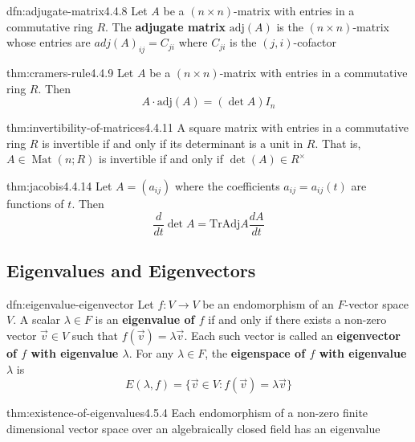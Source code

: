 \documentclass[landscape, 8pt]{extarticle}
\DeclareMathOperator{\Mat}{Mat}
\begin{document}
\begin{multicols}{3}
\begin{dfn}{dfn:adjugate-matrix}{4.4.8}
    Let $A$ be a $(n \times n)$-matrix with entries in a commutative ring $R$. The \textbf{adjugate matrix} $\text{adj}(A)$ is the $(n \times n)$-matrix whose entries are $adj(A)_{ij} = C_{ji}$ where $C_{ji}$ is the $(j, i)$-cofactor
\end{dfn}

\begin{thm}{thm:cramers-rule}{4.4.9}
    Let $A$ be a $(n \times n)$-matrix with entries in a commutative ring $R$. Then
    \[A \cdot \text{adj}(A) = (\det A)I_{n}\]
\end{thm}

\begin{thm}{thm:invertibility-of-matrices}{4.4.11}
    A square matrix with entries in a commutative ring $R$ is invertible if and only if its determinant is a unit in $R$. That is, $A\in \Mat(n;R)$ is invertible if and only if $\det(A)\in R^{\times}$
\end{thm}

\begin{thm}{thm:jacobis}{4.4.14}
    Let $A = (a_{ij})$ where the coefficients $a_{ij} = a_{ij}(t)$ are functions of $t$. Then
    \[\frac{d}{dt} \det A = \text{Tr}\text{Adj} A \frac{dA}{dt}\]
\end{thm}

\subsection{Eigenvalues and Eigenvectors}

\begin{dfn}{dfn:eigenvalue-eigenvector}{}
    Let $f: V \to V $ be an endomorphism of an $F$-vector space $V$. A scalar $\lambda\in F$ is an \textbf{eigenvalue of $f$} if and only if there exists a non-zero vector $\vec{v}\in V$ such that $f(\vec{v}) = \lambda \vec{v}$. Each such vector is called an \textbf{eigenvector of $f$ with eigenvalue $\lambda$}. For any $\lambda\in F$, the \textbf{eigenspace of $f$ with eigenvalue $\lambda$} is
    \[E(\lambda, f) = \{\vec{v}\in V : f(\vec{v}) = \lambda \vec{v}\}\]
\end{dfn}

\begin{thm}{thm:existence-of-eigenvalues}{4.5.4}
    Each endomorphism of a non-zero finite dimensional vector space over an algebraically closed field has an eigenvalue
\end{thm}


\end{multicols}
\end{document}
